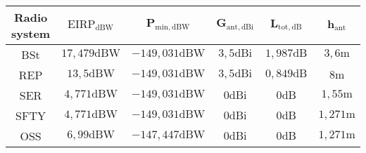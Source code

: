 \footnotesize
\begin{tabular}{|c|c|c|c|c|c|}
	\hline
	\textbf{Radio system} & $\boldsymbol{\mathrm{EIRP}_\mathrm{dBW}}$ & $\boldsymbol{P_\mathrm{min,dBW}}$ & $ \boldsymbol{G_\mathrm{ant,dBi}} $  & $\boldsymbol{L_\mathrm{tot,dB}}$ & $\boldsymbol{h_\mathrm{ant}}$ \\
	\hline
	BSt & $17,479\mathrm{dBW}$ & $-149,031\mathrm{dBW}$ & $3,5\mathrm{dBi}$ &  $1,987\mathrm{dB}$ & $3,6\mathrm{m}$ \\
	REP & $13,5\mathrm{dBW}$ & $-149,031\mathrm{dBW}$ &  $3,5\mathrm{dBi}$ & $0,849\mathrm{dB}$ & $8\mathrm{m}$ \\
	SER & $4,771\mathrm{dBW}$ & $-149,031\mathrm{dBW}$ & $0\mathrm{dBi}$ & $0\mathrm{dB}$ & $1,55\mathrm{m}$ \\
	SFTY & $4,771\mathrm{dBW}$  &  $-149,031\mathrm{dBW}$ &  $0\mathrm{dBi}$ & $0\mathrm{dB}$ & $1,271\mathrm{m}$ \\
	OSS & $6,99\mathrm{dBW}$ & $-147,447\mathrm{dBW}$ &  $0\mathrm{dBi}$ & $0\mathrm{dB}$ & $1,271\mathrm{m}$ \\
	\hline
\end{tabular}